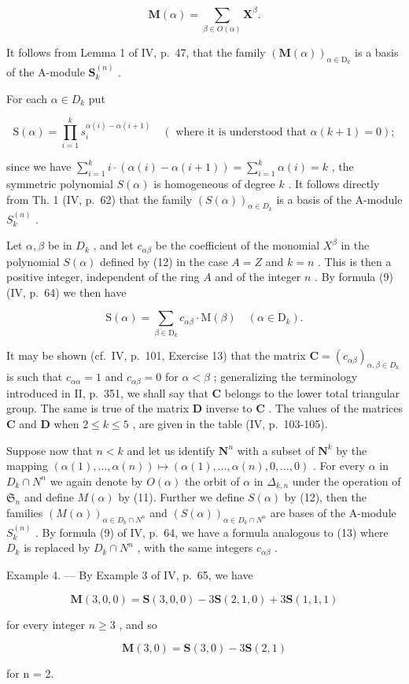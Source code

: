 \[
\mathbf {M} (\alpha) = \sum_ {\beta \in O (\alpha)} \mathbf {X} ^ {\beta}.\tag{11}
\]

It follows from Lemma 1 of IV, p.~47, that the family \((\mathbf{M}(\alpha))_{\alpha \in \mathrm{D}_k}\) is a basis of the A-module \(\mathbf{S}_k^{(n)}\) .

For each \(\alpha \in D_k\) put

\[
\mathrm{S} (\alpha) = \prod_ {i = 1} ^ {k} s _ {i} ^ {\alpha (i) - \alpha (i + 1)} \quad (\text { where   it   is   understood   that } \alpha (k + 1) = 0);\tag{12}
\]

since we have \(\sum_{i=1}^{k} i \cdot (\alpha(i) - \alpha(i+1)) = \sum_{i=1}^{k} \alpha(i) = k\) , the symmetric polynomial \(S(\alpha)\) is homogeneous of degree \(k\) . It follows directly from Th. 1 (IV, p.~62) that the family \((S(\alpha))_{\alpha \in D_k}\) is a basis of the A-module \(S_k^{(n)}\) .

Let \(\alpha, \beta\) be in \(D_k\) , and let \(c_{\alpha\beta}\) be the coefficient of the monomial \(X^\beta\) in the polynomial \(S(\alpha)\) defined by (12) in the case \(A = Z\) and \(k = n\) . This is then a positive integer, independent of the ring \(A\) and of the integer \(n\) . By formula (9) (IV, p.~64) we then have

\[
\mathrm{S} (\alpha) = \sum_ {\beta \in \mathrm{D} _ {k}} c _ {\alpha \beta} \cdot \mathrm{M} (\beta) \quad (\alpha \in \mathrm{D} _ {k}).\tag{13}
\]

It may be shown (cf.~IV, p.~101, Exercise 13) that the matrix \(\mathbf{C} = (c_{\alpha \beta})_{\alpha, \beta \in D_k}\) is such that \(c_{\alpha \alpha} = 1\) and \(c_{\alpha \beta} = 0\) for \(\alpha < \beta\) ; generalizing the terminology introduced in II, p.~351, we shall say that \(\mathbf{C}\) belongs to the lower total triangular group. The same is true of the matrix \(\mathbf{D}\) inverse to \(\mathbf{C}\) . The values of the matrices \(\mathbf{C}\) and \(\mathbf{D}\) when \(2 \leqslant k \leqslant 5\) , are given in the table (IV, p.~103-105).

Suppose now that \(n < k\) and let us identify \(\mathbf{N}^n\) with a subset of \(\mathbf{N}^k\) by the mapping \((\alpha(1), \ldots, \alpha(n)) \mapsto (\alpha(1), \ldots, \alpha(n), 0, \ldots, 0)\) . For every \(\alpha\) in \(D_k \cap N^n\) we again denote by \(O(\alpha)\) the orbit of \(\alpha\) in \(\Delta_{k,n}\) under the operation of \(\mathfrak{S}_n\) and define \(M(\alpha)\) by (11). Further we define \(S(\alpha)\) by (12), then the families \((M(\alpha))_{\alpha \in D_k \cap N^n}\) and \((S(\alpha))_{\alpha \in D_k \cap N^n}\) are bases of the A-module \(S_k^{(n)}\) . By formula (9) of IV, p.~64, we have a formula analogous to (13) where \(D_k\) is replaced by \(D_k \cap N^n\) , with the same integers \(c_{\alpha\beta}\) .

Example 4. --- By Example 3 of IV, p.~65, we have

\[
\mathbf {M} (3, 0, 0) = \mathbf {S} (3, 0, 0) - 3 \mathbf {S} (2, 1, 0) + 3 \mathbf {S} (1, 1, 1)
\]

for every integer \(n \geqslant 3\) , and so

\[
\mathbf {M} (3, 0) = \mathbf {S} (3, 0) - 3 \mathbf {S} (2, 1)
\]

for n = 2.

